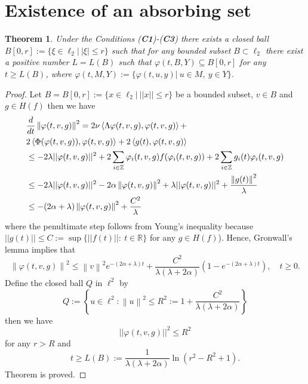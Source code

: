 \documentclass{amsart}%
\newtheorem{theorem}[lemma]{Theorem}
\begin{document}
\section{Existence of an absorbing set}\label{Sec3}


\begin{theorem}\label{th2.1} Under the Conditions (\textbf{C1})-(\textbf{C3})
there exists a closed ball $B[0,r]:=\{\xi \in \ell_{2}|\ |\xi|\le
r\}$ such that for any bounded subset $B\subset \ell_{2}$ there
exist a positive number $L=L(B)$ such that
$\varphi(t,B,Y)\subseteq B[0,r]$ for any $t\ge L(B)$, where
$\varphi(t,M,Y):=\{\varphi(t,u,y)|\ u\in M,\ y\in Y\}$.
\end{theorem}
\begin{proof}
Let $B=B[0,r]:=\{x\in \ell_{2}|\ ||x||\le r\}$ be a bounded
subset, $v\in B$ and $g\in H(f)$ then we have
\begin{eqnarray}\label{eqAS_1}
&\frac{d}{dt}\left\lVert \varphi(t,v,g)\right\rVert ^2 = 2\nu
\left\langle \Lambda \varphi(t,v,g), \varphi(t,v,g)\right\rangle
+\nonumber \\
& 2 \left\langle \Phi (\varphi(t,v,g)), \varphi(t,v,g)\right\rangle + 2 \left\langle g(t), \varphi(t,v,g)\right\rangle \nonumber \\
&\leq -2\lambda ||\varphi(t,v,g)||^{2}+ 2 \sum_{i \in \mathbb{Z} } \varphi_{i}(t,v,g) f(\varphi_{i}(t,v,g)) +
2 \sum_{i \in \mathbb{Z} } g_{i}(t)\varphi_{i}(t,v,g) \nonumber \\
&\leq -2\lambda ||\varphi(t,v,g)||^{2} -2\alpha \left\lVert \varphi(t,v,g)\right\rVert ^2 + \lambda||\varphi(t,v,g)||^{2}+ \frac{\left\lVert g(t)\right\rVert ^2}{\lambda} \notag \\
&\leq -(2\alpha +\lambda)\left\lVert \varphi(t,v,g)\right\rVert ^2
+ \frac{C^{2}}{\lambda}\nonumber
\end{eqnarray}
where the penultimate step follows from Young's inequality because
$||g(t)|| \leq C:=\sup\{||f(t)||:\ t\in \mathbb R\}$ for any $g
\in H(f)$). Hence, Gronwall's lemma implies that
\[
\left\lVert \varphi(t,v,g) \right\rVert^2 \leq \left\lVert v
\right\rVert^2 e^{-(2\alpha +\lambda)t} + \frac{C ^2}{\lambda
(\lambda +2\alpha)} \left( 1 - e^{-(2\alpha +\lambda) t} \right),
\quad t \ge 0.
\]
Define the closed ball \( Q \) in \( \ell^2 \) by
\[
Q := \left\{ u \in \ell^2 : \left\lVert u \right\rVert^2 \le R^2
:= 1 + \frac{C^2}{\lambda (\lambda +2\alpha)} \right\}
\]
then we have
\begin{equation}\label{eqAS1}
||\varphi(t,v,g)||^{2}\le R^{2}\nonumber
\end{equation}
for any $r>R$ and
\begin{equation}\label{eqAS2}
t\ge L(B):=\frac{1}{\lambda (\lambda +2\alpha)}\ln (r^{2}-R^{2}
+1).\nonumber
\end{equation}
Theorem is proved.
\end{proof}
\end{document}
